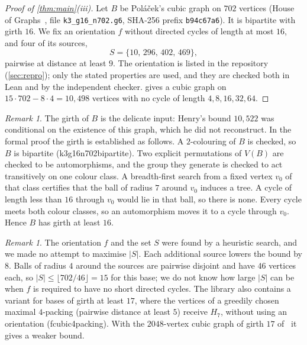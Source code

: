 \documentclass[11pt]{amsart}
\theoremstyle{definition}
\theoremstyle{remark}
\newtheorem{remark}[theorem]{Remark}
\newcommand{\Hseven}{H_7}
\newcommand{\leanus}{\textunderscore\allowbreak}
\newcommand{\lean}[1]{{\ttfamily\let\_\leanus #1}}
\begin{document}
\begin{proof}[Proof of \cref{thm:main}(iii)]
Let $B$ be Poláček's cubic graph on $702$ vertices (House of
Graphs~\cite{HoG}, file \texttt{k3\_g16\_n702.g6}, SHA-256 prefix
\texttt{b94c67a6}). It is bipartite with girth $16$. We fix an orientation $f$
without directed cycles of length at most $16$, and four of its sources,
\[
S=\{10,\,296,\,402,\,469\},
\]
pairwise at distance at least $9$. The orientation is listed in the repository
(\cref{sec:repro}); only the stated properties are used, and they are checked
both in Lean and by the independent checker.  gives a cubic
graph on $15\cdot 702-8\cdot 4=10{,}498$ vertices with no cycle of length
$4,8,16,32,64$.
\end{proof}

\begin{remark}
The girth of $B$ is the delicate input: Henry's bound $10{,}522$ was
conditional on the existence of this graph, which he did not reconstruct. In the
formal proof the girth is established as follows. A $2$-colouring of $B$ is
checked, so $B$ is bipartite (\lean{k3\_g16\_n702\_bipartite}). Two explicit
permutations of $V(B)$ are checked to be automorphisms, and the group they
generate is checked to act transitively on one colour class. A breadth-first
search from a fixed vertex $v_0$ of that class certifies that the ball of
radius $7$ around $v_0$ induces a tree. A cycle of length less than $16$
through $v_0$ would lie in that ball, so there is none. Every cycle meets both
colour classes, so an automorphism moves it to a cycle through $v_0$. Hence $B$
has girth at least $16$.
\end{remark}

\begin{remark}
The orientation $f$ and the set $S$ were found by a heuristic search, and we
made no attempt to maximise $|S|$. Each additional source lowers the bound by
$8$. Balls of radius $4$ around the sources are pairwise disjoint and have $46$
vertices each, so $|S|\le\lfloor 702/46\rfloor=15$ for this base; we do not
know how large $|S|$ can be when $f$ is required to have no short directed
cycles. The library also contains a variant for bases of girth at least $17$,
where the vertices of a greedily chosen maximal $4$-packing (pairwise
distance at least $5$) receive $\Hseven$, without using an orientation
(\lean{f\_cubic\_6\_4packing}). With the
$2048$-vertex cubic graph of girth $17$ of~\cite{EGJSV2026} it gives a weaker
bound.
\end{remark}
\end{document}
